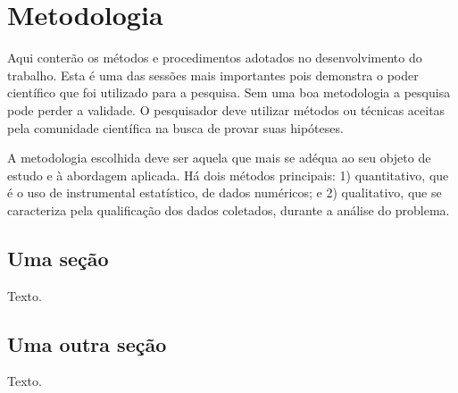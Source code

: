 \chapter{Metodologia}

Aqui conterão os métodos e procedimentos adotados no desenvolvimento do
trabalho. Esta é uma das sessões mais importantes pois demonstra o poder
científico que foi utilizado para a pesquisa. Sem uma boa metodologia a
pesquisa pode perder a validade. O pesquisador deve utilizar métodos ou
técnicas aceitas pela comunidade científica na busca de provar suas hipóteses.

A metodologia escolhida deve ser aquela que mais se adéqua ao seu objeto de
estudo e à abordagem aplicada. Há dois métodos principais: 1) quantitativo, que
é o uso de instrumental estatístico, de dados numéricos; e 2) qualitativo, que
se caracteriza pela qualificação dos dados coletados, durante a análise do
problema.

\section{Uma seção}
Texto.

\section{Uma outra seção}
Texto.